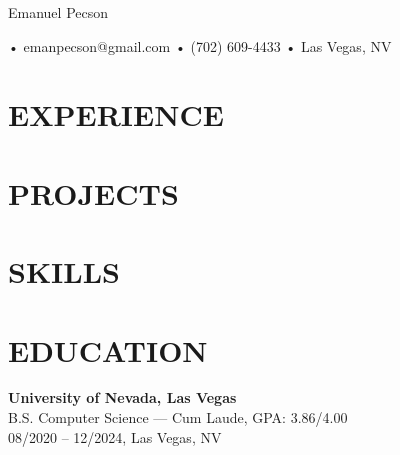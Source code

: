 \documentclass[letterpaper,10pt]{article}
\begin{document}
\begin{center}
  {\fontsize{20}{20}\robotoregular Emanuel Pecson} \\

	\vspace{0.5em}

	\hspace{0.6em}•\hspace{0.6em}
	emanpecson@gmail.com
	\hspace{0.6em}•\hspace{0.6em}
	(702) 609-4433
	\hspace{0.6em}•\hspace{0.6em}
	Las Vegas, NV
\end{center}

\section*{EXPERIENCE} %




\section*{PROJECTS}



\section*{SKILLS}


\section*{EDUCATION}
\textbf{University of Nevada, Las Vegas} \\
B.S. Computer Science — \textnormal{Cum Laude}, GPA: 3.86/4.00 \\
08/2020 – 12/2024, Las Vegas, NV
\end{document}
